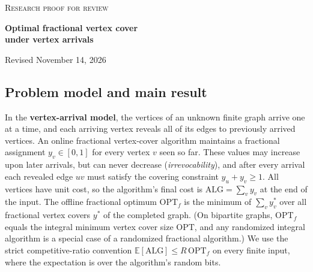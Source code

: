 \documentclass[11pt,letterpaper]{article}
\begin{document}
\thispagestyle{plain}
\begin{center}
{\small\scshape Research proof for review}\par\medskip
{\LARGE\bfseries Optimal fractional vertex cover\\[2pt] under vertex arrivals\par}
\medskip
{\small Revised November 14, 2026}
\end{center}

\begin{abstract}
\noindent
We prove that no randomized online fractional (or integral) vertex-cover algorithm can achieve a competitive ratio strictly below Wang and Wong's constant $B^* \approx 1.9007617$ ($B^* = 1.9007616968738465\ldots$) under vertex arrivals, even on unweighted bipartite graphs against an oblivious adversary. Together with the general-graph upper bound of Wang and Wong~\cite{ww}, this settles the optimal competitive ratio of online vertex cover under vertex arrivals on both bipartite and general graphs. Our lower bound constructs a rooted tree of vertex pools completed by private leaves, and uses a coupled random-walk interleaving lemma to show that observing both endpoints of a tree edge gives no informational advantage over independent subtree strategies. This decoupling forces the Pareto frontier between inside-root and outside-root cover budgets to obey a variational inequality whose minimum recovers $B^*$.
\end{abstract}

\subsection*{Problem model and main result}

In the \textbf{vertex-arrival model}, the vertices of an unknown finite graph arrive one at a time, and each arriving vertex reveals all of its edges to previously arrived vertices. An online fractional vertex-cover algorithm maintains a fractional assignment $y_v\in[0,1]$ for every vertex $v$ seen so far. These values may increase upon later arrivals, but can never decrease (\emph{irrevocability}), and after every arrival each revealed edge $uv$ must satisfy the covering constraint $y_u+y_v\ge1$. All vertices have unit cost, so the algorithm's final cost is $\mathrm{ALG}=\sum_v y_v$ at the end of the input. The offline fractional optimum $\mathrm{OPT}_f$ is the minimum of $\sum_v y_v^*$ over all fractional vertex covers $y^*$ of the completed graph. (On bipartite graphs, $\mathrm{OPT}_f$ equals the integral minimum vertex cover size $\mathrm{OPT}$, and any randomized integral algorithm is a special case of a randomized fractional algorithm.) We use the strict competitive-ratio convention $\mathbb E[\mathrm{ALG}]\le R\,\mathrm{OPT}_f$ on every finite input, where the expectation is over the algorithm's random bits.
\end{document}
